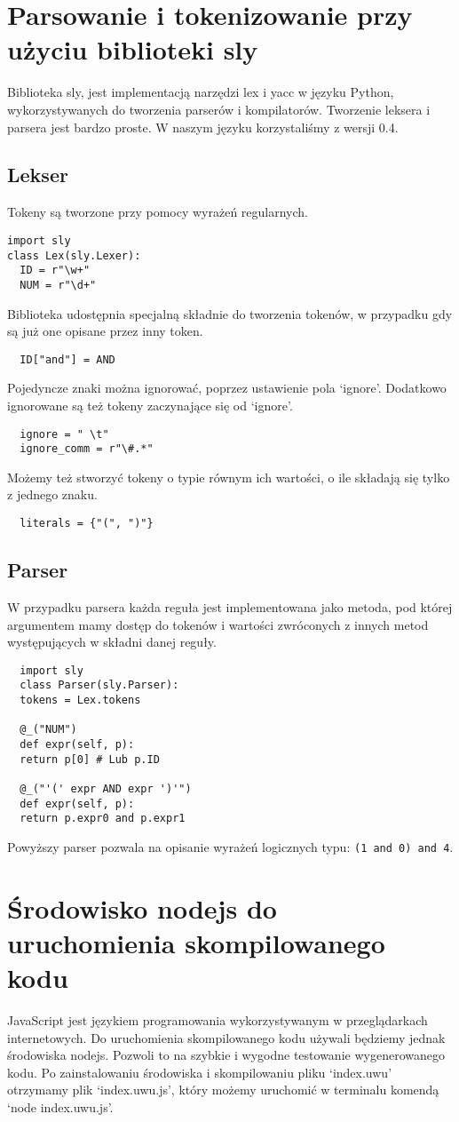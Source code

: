 \documentclass[a4paper,12pt]{book} %
\begin{document}
\section{Parsowanie i tokenizowanie przy użyciu biblioteki sly}
Biblioteka sly, jest implementacją narzędzi lex i yacc w języku Python, wykorzystywanych do tworzenia parserów i kompilatorów. Tworzenie leksera i parsera jest bardzo proste.
W naszym języku korzystaliśmy z wersji 0.4.

\subsection{Lekser}
Tokeny są tworzone przy pomocy wyrażeń regularnych.
\begin{lstlisting}
import sly
class Lex(sly.Lexer):
  ID = r"\w+"
  NUM = r"\d+"
\end{lstlisting}
Biblioteka udostępnia specjalną składnie do tworzenia tokenów, w przypadku gdy są już one opisane przez inny token.
\begin{lstlisting}
  ID["and"] = AND
\end{lstlisting}
Pojedyncze znaki można ignorować, poprzez ustawienie pola `ignore'.
Dodatkowo ignorowane są też tokeny zaczynające się od `ignore'.
\begin{lstlisting}
  ignore = " \t"
  ignore_comm = r"\#.*"
\end{lstlisting}
Możemy też stworzyć tokeny o typie równym ich wartości, o ile składają się tylko z jednego znaku.
\begin{lstlisting}
  literals = {"(", ")"}
\end{lstlisting}

\subsection{Parser}
W przypadku parsera każda reguła jest implementowana jako metoda, pod której argumentem mamy dostęp do tokenów i wartości zwróconych z innych metod występujących w składni danej reguły.
\begin{lstlisting}
  import sly
  class Parser(sly.Parser):
  tokens = Lex.tokens
  
  @_("NUM")
  def expr(self, p):
  return p[0] # Lub p.ID
  
  @_("'(' expr AND expr ')'")
  def expr(self, p):
  return p.expr0 and p.expr1
\end{lstlisting}
Powyższy parser pozwala na opisanie wyrażeń logicznych typu: \lstinline{(1 and 0) and 4}.
\section{Środowisko nodejs do uruchomienia skompilowanego kodu}
JavaScript jest językiem programowania wykorzystywanym w przeglądarkach internetowych. Do uruchomienia skompilowanego kodu używali będziemy jednak środowiska nodejs. Pozwoli to na szybkie i wygodne testowanie wygenerowanego kodu. Po zainstalowaniu środowiska i skompilowaniu pliku `index.uwu' otrzymamy plik `index.uwu.js', który możemy uruchomić w terminalu komendą `node index.uwu.js'.
\end{document}
